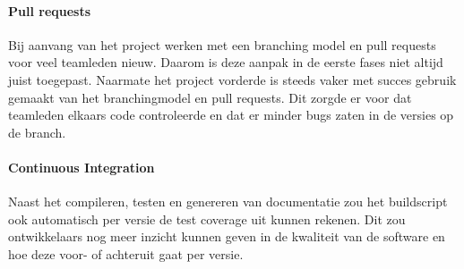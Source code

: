 
\paragraph{Pull requests}
Bij aanvang van het project werken met een branching model en pull requests voor veel teamleden nieuw. Daarom is deze aanpak in de eerste fases niet altijd juist toegepast. Naarmate het project vorderde is steeds vaker met succes gebruik gemaakt van het branchingmodel en pull requests. Dit zorgde er voor dat teamleden elkaars code controleerde en dat er minder bugs zaten in de versies op de  branch.

\paragraph{Continuous Integration} Naast het compileren, testen en genereren van documentatie zou het buildscript ook automatisch per versie de test coverage uit kunnen rekenen. Dit zou ontwikkelaars nog meer inzicht kunnen geven in de kwaliteit van de software en hoe deze voor- of achteruit gaat per versie.
